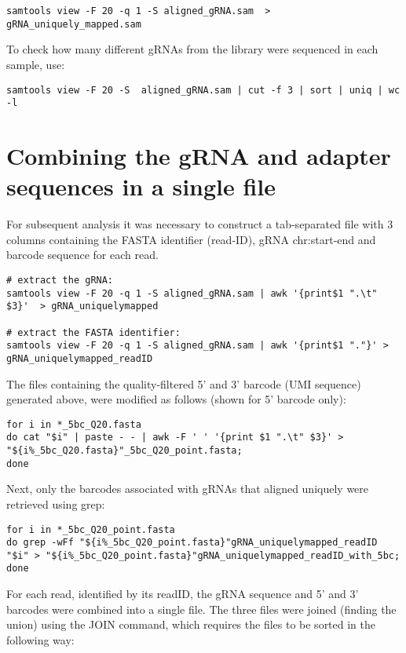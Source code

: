 \begin{lstlisting}
samtools view -F 20 -q 1 -S aligned_gRNA.sam  > gRNA_uniquely_mapped.sam
\end{lstlisting}

To check how many different gRNAs from the library were sequenced in each sample, use:

\begin{lstlisting}
samtools view -F 20 -S  aligned_gRNA.sam | cut -f 3 | sort | uniq | wc -l
\end{lstlisting}


\section{Combining the gRNA and adapter sequences in a single file}

For subsequent analysis it was necessary to construct a tab-separated file with 3 columns containing the FASTA identifier (read-ID), gRNA chr:start-end and barcode sequence for each read.

\begin{lstlisting}
# extract the gRNA:
samtools view -F 20 -q 1 -S aligned_gRNA.sam | awk '{print$1 ".\t" $3}'  > gRNA_uniquelymapped

# extract the FASTA identifier:
samtools view -F 20 -q 1 -S aligned_gRNA.sam | awk '{print$1 "."}' > gRNA_uniquelymapped_readID
\end{lstlisting}

The files containing the quality-filtered 5' and 3' barcode (UMI sequence) generated above, were modified as follows (shown for 5' barcode only):

\begin{lstlisting}
for i in *_5bc_Q20.fasta
do cat "$i" | paste - - | awk -F ' ' '{print $1 ".\t" $3}' > "${i%_5bc_Q20.fasta}"_5bc_Q20_point.fasta;
done
\end{lstlisting}

Next, only the barcodes associated with gRNAs that aligned uniquely were retrieved using grep:

\begin{lstlisting}
for i in *_5bc_Q20_point.fasta
do grep -wFf "${i%_5bc_Q20_point.fasta}"gRNA_uniquelymapped_readID "$i" > "${i%_5bc_Q20_point.fasta}"gRNA_uniquelymapped_readID_with_5bc;
done
\end{lstlisting}

For each read, identified by its readID, the gRNA sequence and 5' and 3' barcodes were combined into a single file. The three files were joined (finding the union) using the JOIN command, which requires the files to be sorted in the following way:

